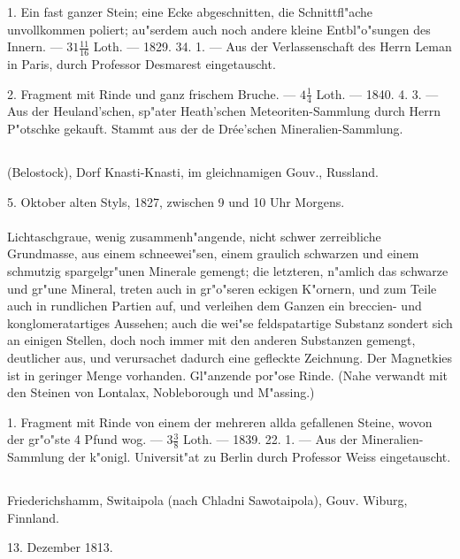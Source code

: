 \documentclass[a4paper, 11pt, oneside, polutonikogreek, german]{article}
\begin{document}
1. Ein fast ganzer Stein; eine Ecke abgeschnitten, die Schnittfl"ache unvollkommen poliert; au"serdem auch noch andere kleine Entbl"o"sungen des Innern. --- $\mathfrak{31\frac{11}{16}}$ Loth. --- 1829. 34. 1. --- Aus der Verlassenschaft des Herrn Leman in Paris, durch Professor Desmarest eingetauscht.

2. Fragment mit Rinde und ganz frischem Bruche. --- $\mathfrak{4\frac{1}{4}}$ Loth. --- 1840. 4. 3. --- Aus der Heuland'schen, sp"ater Heath'schen Meteoriten-Sammlung durch Herrn P"otschke gekauft. Stammt aus der de Drée'schen Mineralien-Sammlung.
\subsection{}
\begin{center}

(Belostock), Dorf Knasti-Knasti, im gleichnamigen Gouv., Russland.

5. Oktober alten Styls, 1827, zwischen 9 und 10 Uhr Morgens.
\end{center}
\paragraph{}
Lichtaschgraue, wenig zusammenh"angende, nicht schwer zerreibliche Grundmasse, aus einem schneewei"sen, einem graulich schwarzen und einem schmutzig spargelgr"unen Minerale gemengt; die letzteren, n"amlich das schwarze und gr"une Mineral, treten auch in gr"o"seren eckigen K"ornern, und zum Teile auch in rundlichen Partien auf, und verleihen dem Ganzen ein breccien- und konglomeratartiges Aussehen; auch die wei"se feldspatartige Substanz sondert sich an einigen Stellen, doch noch immer mit den anderen Substanzen gemengt, deutlicher aus, und verursachet dadurch eine gefleckte Zeichnung. Der Magnetkies ist in geringer Menge vorhanden. Gl"anzende por"ose Rinde. (Nahe verwandt mit den Steinen von Lontalax, Nobleborough und M"assing.)

1. Fragment mit Rinde von einem der mehreren allda gefallenen Steine, wovon der gr"o"ste 4 Pfund wog. --- $\mathfrak{3\frac{3}{8}}$ Loth. --- 1839. 22. 1. --- Aus der Mineralien-Sammlung der k"onigl. Universit"at zu Berlin durch Professor Weiss eingetauscht.
\subsection{}
\begin{center}

Friederichshamm, Switaipola (nach Chladni Sawotaipola), Gouv. Wiburg, Finnland.

13. Dezember 1813.
\end{center}
\end{document}
